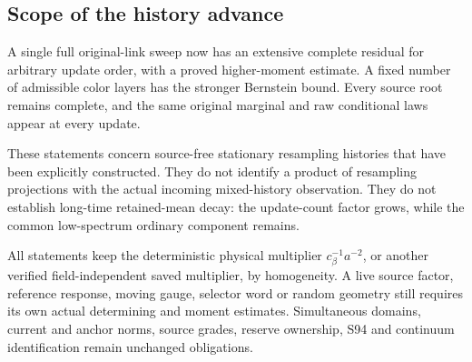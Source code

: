 \subsection{Scope of the history advance}

A single full original-link sweep now has an extensive complete residual for arbitrary update order, with a proved higher-moment estimate. A fixed number of admissible color layers has the stronger Bernstein bound. Every source root remains complete, and the same original marginal and raw conditional laws appear at every update.

These statements concern source-free stationary resampling histories that have been explicitly constructed. They do not identify a product of resampling projections with the actual incoming mixed-history observation. They do not establish long-time retained-mean decay: the update-count factor grows, while the common low-spectrum ordinary component remains.

All statements keep the deterministic physical multiplier \(c_\beta^{-1}a^{-2}\), or another verified field-independent saved multiplier, by homogeneity. A live source factor, reference response, moving gauge, selector word or random geometry still requires its own actual determining and moment estimates. Simultaneous domains, current and anchor norms, source grades, reserve ownership, S94 and continuum identification remain unchanged obligations.
